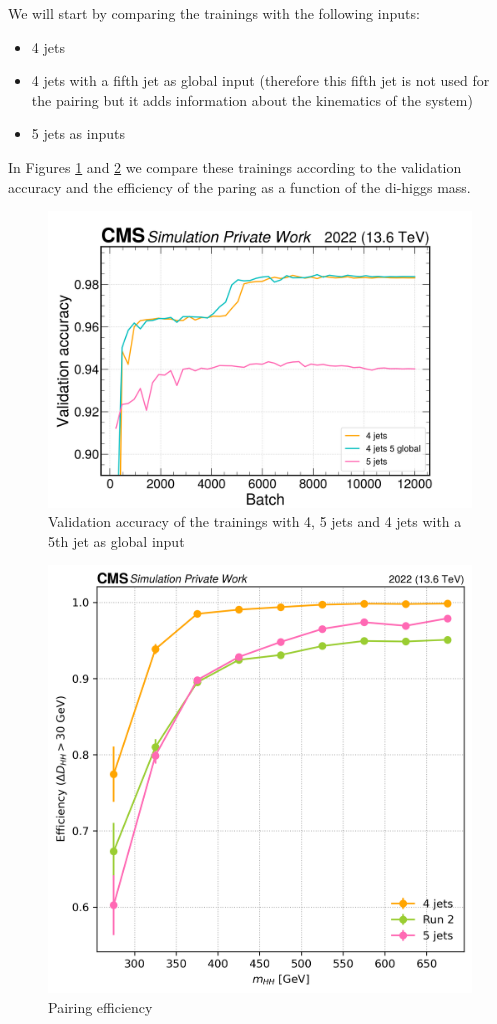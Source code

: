 We will start by comparing the trainings with the following inputs: 
\begin{itemize} [itemsep=0.1em]
    \item 4 jets 
    \item 4 jets with a fifth jet as global input (therefore this fifth jet is not used for the pairing but it adds information about the kinematics of the system)
    \item 5 jets as inputs
\end{itemize}

In Figures \ref{fig: val acc 4j/5j/4j5g} and \ref{fig: eff 4j/5j/4j5g} we compare these trainings according to the validation accuracy and the efficiency of the paring as a function of the di-higgs mass.

\begin{figure}[hbt]
    \centering
    \includegraphics[width=0.5\linewidth]{Images/6.Improving/Imput Comparisons/VA 4 vs 5 vs 4j5g.png}
    \caption{Validation accuracy of the trainings with 4, 5 jets and 4 jets with a 5th jet as global input}
    \label{fig: val acc 4j/5j/4j5g}
\end{figure}


\begin{figure}[hbt]
    \centering
    \includegraphics[width=0.5\linewidth]{Images/6.Improving/Imput Comparisons/Eff 4 vs 5 vs R2.png}
    \caption{Pairing efficiency}
    \label{fig: eff 4j/5j/4j5g}
\end{figure}



